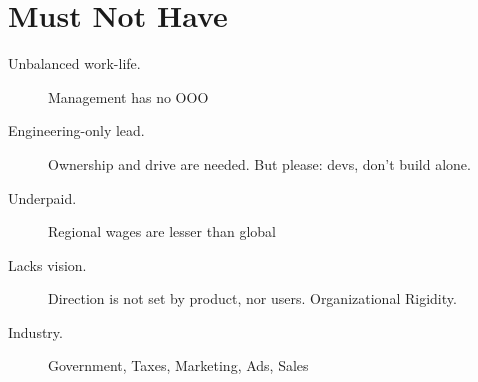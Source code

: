 \documentclass[10pt, a4paper, twocolumn]{article}
\begin{document}


\section*{Must Not Have}

\begin{description}
  \item[Unbalanced work-life.] Management has no OOO
  \item[Engineering-only lead.]
  Ownership and drive are needed.
  But please: %
  devs, don't build alone.
 \item[Underpaid.] Regional wages are lesser than global
 \item[Lacks vision.] Direction is not set by product, nor users. Organizational Rigidity.
  \item[Industry.] Government, Taxes, Marketing, Ads, Sales
\end{description}



\end{document}
